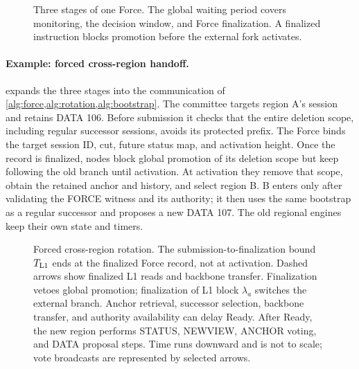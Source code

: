 \documentclass[11pt,a4paper]{article}
\begin{document}
\begin{figure}[htbp]\centering
{}
\caption{Three stages of one Force. The global waiting period covers
monitoring, the decision window, and Force finalization. A finalized
instruction blocks promotion before the external fork activates.}
\label{fig:force-stages}
\end{figure}

\paragraph{Example: forced cross-region handoff.}
 expands the three stages into the
communication of \cref{alg:force,alg:rotation,alg:bootstrap}. The
committee targets region A's session and retains DATA 106. Before
submission it checks that the entire deletion scope, including regular
successor sessions, avoids its protected prefix. The Force binds the
target session ID, cut, future status map, and activation height. Once
the record is finalized, nodes block global promotion of its deletion
scope but keep following the old branch until activation. At activation
they remove that scope, obtain the retained anchor and history, and
select region B. B enters only after validating the FORCE witness and
its authority; it then uses the same bootstrap as a regular successor
and proposes a new DATA 107. The old regional engines keep their own
state and timers.

\begin{figure}[htbp]\centering

\caption{Forced cross-region rotation. The submission-to-finalization
bound $T_{\rm L1}$ ends at the finalized Force record, not at activation.
Dashed arrows show finalized L1 reads and backbone transfer. Finalization
vetoes global promotion; finalization of L1 block $\lambda_a$ switches
the external branch. Anchor retrieval, successor selection, backbone
transfer, and authority availability can delay Ready. After Ready, the
new region performs STATUS, NEWVIEW, ANCHOR voting, and DATA proposal
steps. Time runs downward and is not to scale; vote broadcasts are
represented by selected arrows.}
\label{fig:forced-cross-region}
\end{figure}
\FloatBarrier
\end{document}
